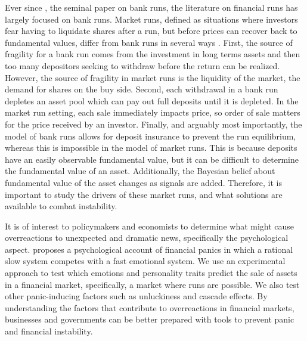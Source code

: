 \documentclass[11pt]{article}
\begin{document}
Ever since \cite{diamond1983bank}, the seminal paper on bank runs, the literature on financial runs has largely focused on bank runs. Market runs, defined as situations where investors fear having to liquidate shares after a run, but before prices can recover back to fundamental values, differ from bank runs in several ways \citep{bernardo2004liquidity}. First, the source of fragility for a bank run comes from the investment in long terms assets and then too many depositors seeking to withdraw before the return can be realized. However, the source of fragility in market runs is the liquidity of the market, the demand for shares on the buy side. Second, each withdrawal in a bank run depletes an asset pool which can pay out full deposits until it is depleted. In the market run setting, each sale immediately impacts price, so order of sale matters for the price received by an investor. Finally, and arguably most importantly, the model of bank runs allows for deposit insurance to prevent the run equilibrium, whereas this is impossible in the model of market runs. This is because deposits have an easily observable fundamental value, but it can be difficult to determine the fundamental value of an asset. Additionally, the Bayesian belief about fundamental value of the asset changes as signals are added. Therefore, it is important to study the drivers of these market runs, and what solutions are available to combat instability.

It is of interest to policymakers and economists to determine what might cause overreactions to unexpected and dramatic news, specifically the psychological aspect. \cite{bracha2012psychological} proposes a psychological account of financial panics in which a rational slow system competes with a fast emotional system. We use an experimental approach to test which emotions and personality traits predict the sale of assets in a financial market, specifically, a market where runs are possible. We also test other panic-inducing factors such as unluckiness and cascade effects. By understanding the factors that contribute to overreactions in financial markets, businesses and governments can be better prepared with tools to prevent panic and financial instability.
\end{document}
